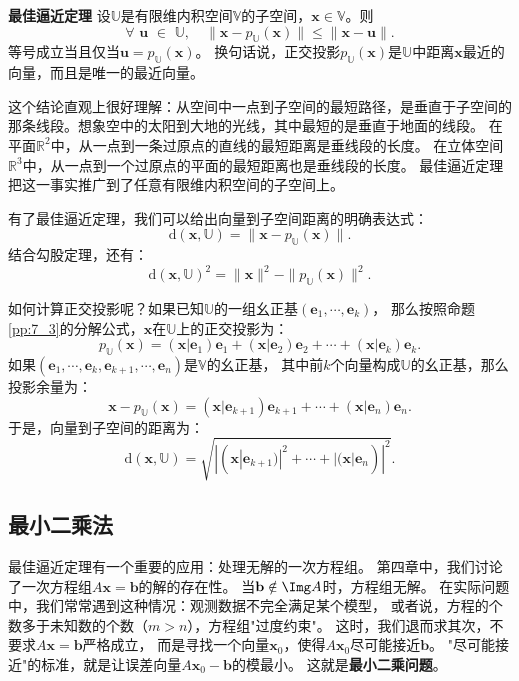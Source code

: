 \documentclass[12pt,UTF8]{ctexbook}
\begin{document}
\begin{pp}\textbf{最佳逼近定理}\label{pp:7_9}
设$\mathbb{U}$是有限维内积空间$\mathbb{V}$的子空间，$\mathbf{x} \in \mathbb{V}$。则
$$ \forall \,\, \mathbf{u} \,\, \in \,\, \mathbb{U}, \quad \|\mathbf{x} - p_\mathbb{U}(\mathbf{x})\| \leqslant \|\mathbf{x} - \mathbf{u}\|. $$
等号成立当且仅当$\mathbf{u} = p_\mathbb{U}(\mathbf{x})$。
换句话说，正交投影$p_\mathbb{U}(\mathbf{x})$是$\mathbb{U}$中距离$\mathbf{x}$最近的向量，而且是唯一的最近向量。
\end{pp}

这个结论直观上很好理解：从空间中一点到子空间的最短路径，是垂直于子空间的那条线段。想象空中的太阳到大地的光线，其中最短的是垂直于地面的线段。
在平面$\mathbb{R}^2$中，从一点到一条过原点的直线的最短距离是垂线段的长度。
在立体空间$\mathbb{R}^3$中，从一点到一个过原点的平面的最短距离也是垂线段的长度。
最佳逼近定理把这一事实推广到了任意有限维内积空间的子空间上。

有了最佳逼近定理，我们可以给出向量到子空间距离的明确表达式：
$$ \mathrm{d}(\mathbf{x}, \mathbb{U}) = \|\mathbf{x} - p_\mathbb{U}(\mathbf{x})\|. $$
结合勾股定理，还有：
$$ \mathrm{d}(\mathbf{x}, \mathbb{U})^2 = \|\mathbf{x}\|^2 - \|p_\mathbb{U}(\mathbf{x})\|^2. $$

如何计算正交投影呢？如果已知$\mathbb{U}$的一组幺正基$(\mathbf{e}_1, \cdots, \mathbf{e}_k)$，
那么按照命题\ref{pp:7_3}的分解公式，$\mathbf{x}$在$\mathbb{U}$上的正交投影为：
$$ p_\mathbb{U}(\mathbf{x}) = (\mathbf{x}|\mathbf{e}_1)\mathbf{e}_1 + (\mathbf{x}|\mathbf{e}_2)\mathbf{e}_2 + \cdots + (\mathbf{x}|\mathbf{e}_k)\mathbf{e}_k. $$
如果$(\mathbf{e}_1, \cdots, \mathbf{e}_k, \mathbf{e}_{k+1}, \cdots, \mathbf{e}_n)$是$\mathbb{V}$的幺正基，
其中前$k$个向量构成$\mathbb{U}$的幺正基，那么投影余量为：
$$ \mathbf{x} - p_\mathbb{U}(\mathbf{x}) = (\mathbf{x}|\mathbf{e}_{k+1})\mathbf{e}_{k+1} + \cdots + (\mathbf{x}|\mathbf{e}_n)\mathbf{e}_n. $$
于是，向量到子空间的距离为：
$$ \mathrm{d}(\mathbf{x}, \mathbb{U}) = \sqrt{|(\mathbf{x}|\mathbf{e}_{k+1})|^2 + \cdots + |(\mathbf{x}|\mathbf{e}_n)|^2}. $$

\subsection{最小二乘法}

最佳逼近定理有一个重要的应用：处理无解的一次方程组。
第四章中，我们讨论了一次方程组$A\mathbf{x} = \mathbf{b}$的解的存在性。
当$\mathbf{b} \notin \Img A$时，方程组无解。
在实际问题中，我们常常遇到这种情况：观测数据不完全满足某个模型，
或者说，方程的个数多于未知数的个数（$m > n$），方程组"过度约束"。
这时，我们退而求其次，不要求$A\mathbf{x} = \mathbf{b}$严格成立，
而是寻找一个向量$\mathbf{x}_0$，使得$A\mathbf{x}_0$尽可能接近$\mathbf{b}$。
"尽可能接近"的标准，就是让误差向量$A\mathbf{x}_0 - \mathbf{b}$的模最小。
这就是\textbf{最小二乘问题}。
\end{document}
